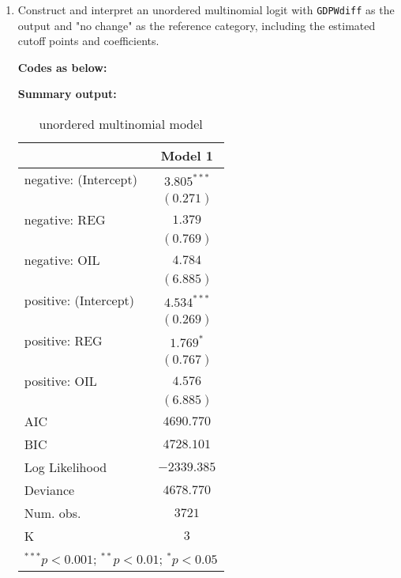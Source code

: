 \documentclass[12pt,a4paper]{article}
\begin{document}
\begin{enumerate}
	\item Construct and interpret an unordered multinomial logit with \texttt{GDPWdiff} as the output and "no change" as the reference category, including the estimated cutoff points and coefficients.
	
	\noindent \textbf{Codes as below:}
	
	\noindent \textbf{Summary output:}
	\begin{table}[h]  %
		\begin{center}
			\begin{tabular}{l c}\hline & Model 1 \\\hline negative: (Intercept) & $3.805^{***}$ \\                      & $(0.271)$     \\negative: REG         & $1.379$       \\                      & $(0.769)$     \\negative: OIL         & $4.784$       \\                      & $(6.885)$     \\\hline positive: (Intercept) & $4.534^{***}$ \\                      & $(0.269)$     \\positive: REG         & $1.769^{*}$   \\                      & $(0.767)$     \\positive: OIL         & $4.576$       \\                      & $(6.885)$     \\\hline AIC                   & $4690.770$    \\BIC                   & $4728.101$    \\Log Likelihood        & $-2339.385$   \\Deviance              & $4678.770$    \\Num. obs.             & $3721$        \\K                     & $3$           \\\hline\multicolumn{2}{l}{\scriptsize{$^{***}p<0.001$; $^{**}p<0.01$; $^{*}p<0.05$}}
			\end{tabular}\caption{unordered multinomial model}\label{table:coefficients}
		\end{center}
	\end{table}
	

\end{enumerate}
\end{document}
